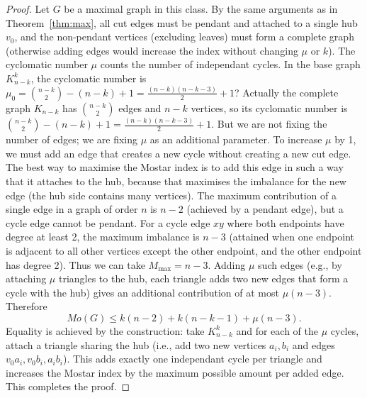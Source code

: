 \documentclass[12pt,a4paper]{article}
\theoremstyle{definition}
\begin{document}
\begin{proof}
Let \(G\) be a maximal graph in this class. By the same arguments as in Theorem~\ref{thm:max}, all cut edges must be pendant and attached to a single hub \(v_0\), and the non‑pendant vertices (excluding leaves) must form a complete graph (otherwise adding edges would increase the index without changing \(\mu\) or \(k\)). The cyclomatic number \(\mu\) counts the number of independant cycles. In the base graph \(K_{n-k}^k\), the cyclomatic number is \(\mu_0 = \binom{n-k}{2} - (n-k) + 1 = \frac{(n-k)(n-k-3)}{2}+1\)? Actually the complete graph \(K_{n-k}\) has \(\binom{n-k}{2}\) edges and \(n-k\) vertices, so its cyclomatic number is \(\binom{n-k}{2} - (n-k) + 1 = \frac{(n-k)(n-k-3)}{2}+1\). But we are not fixing the number of edges; we are fixing \(\mu\) as an additional parameter. To increase \(\mu\) by 1, we must add an edge that creates a new cycle without creating a new cut edge. The best way to maximise the Mostar index is to add this edge in such a way that it attaches to the hub, because that maximises the imbalance for the new edge (the hub side contains many vertices). The maximum contribution of a single edge in a graph of order \(n\) is \(n-2\) (achieved by a pendant edge), but a cycle edge cannot be pendant. For a cycle edge \(xy\) where both endpoints have degree at least 2, the maximum imbalance is \(n-3\) (attained when one endpoint is adjacent to all other vertices except the other endpoint, and the other endpoint has degree 2). Thus we can take \(M_{\max}=n-3\). Adding \(\mu\) such edges (e.g., by attaching \(\mu\) triangles to the hub, each triangle adds two new edges that form a cycle with the hub) gives an additional contribution of at most \(\mu(n-3)\). Therefore
\[
Mo(G) \le k(n-2) + k(n-k-1) + \mu(n-3).
\]
Equality is achieved by the construction: take \(K_{n-k}^k\) and for each of the \(\mu\) cycles, attach a triangle sharing the hub (i.e., add two new vertices \(a_i,b_i\) and edges \(v_0a_i, v_0b_i, a_ib_i\)). This adds exactly one independant cycle per triangle and increases the Mostar index by the maximum possible amount per added edge. This completes the proof.
\end{proof}
\end{document}
